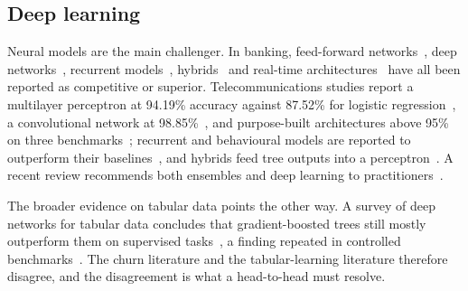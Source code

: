 \documentclass[conference]{IEEEtran}
\begin{document}
\subsection{Deep learning}
Neural models are the main challenger. In banking, feed-forward networks~\cite{zaky2022banking,baby2023artificial,santoso2024artificial,setiana2025improving}, deep networks~\cite{seid2022machine}, recurrent models~\cite{haddadi2022iranian,latheef2021lstm}, hybrids~\cite{hemalatha2019hybrid,pathan2026intelligent} and real-time architectures~\cite{gera2026forecasting} have all been reported as competitive or superior. Telecommunications studies report a multilayer perceptron at 94.19\% accuracy against 87.52\% for logistic regression~\cite{bharadwaj2018mobile}, a convolutional network at 98.85\%~\cite{karanovic2018telecommunication}, and purpose-built architectures above 95\% on three benchmarks~\cite{saha2024churnnet}; recurrent and behavioural models are reported to outperform their baselines~\cite{hu2018prnn,agrawal2018modelling,cao2019deep,zhang2017deep}, and hybrids feed tree outputs into a perceptron~\cite{tang2020xgboost}. A recent review recommends both ensembles and deep learning to practitioners~\cite{manzoor2024review}.

The broader evidence on tabular data points the other way. A survey of deep networks for tabular data concludes that gradient-boosted trees still mostly outperform them on supervised tasks~\cite{borisov2024deep}, a finding repeated in controlled benchmarks~\cite{grinsztajn2022tree,shwartzziv2022tabular,pasaribu2024tabular}. The churn literature and the tabular-learning literature therefore disagree, and the disagreement is what a head-to-head must resolve.
\end{document}
